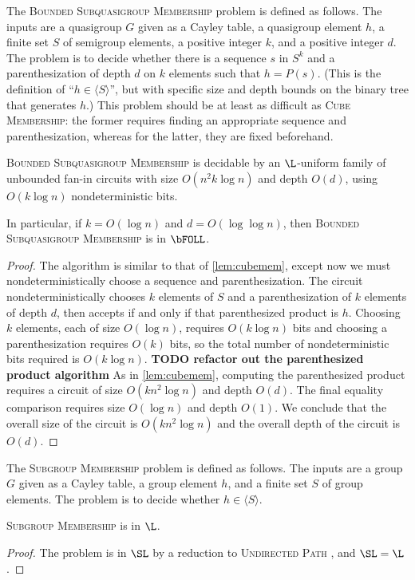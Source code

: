 \documentclass{article}
\newcommand{\todo}[1]{\textbf{TODO #1}}
\newcommand{\gen}[1]{\langle #1 \rangle}
\begin{document}
The \textsc{Bounded Subquasigroup Membership} problem is defined as follows.
The inputs are a quasigroup $G$ given as a Cayley table, a quasigroup element $h$, a finite set $S$ of semigroup elements, a positive integer $k$, and a positive integer $d$.
The problem is to decide whether there is a sequence $s$ in $S^k$ and a parenthesization of depth $d$ on $k$ elements such that $h = P(s)$.
(This is the definition of ``$h \in \gen{S}$'', but with specific size and depth bounds on the binary tree that generates $h$.)
This problem should be at least as difficult as \textsc{Cube Membership}: the former requires finding an appropriate sequence and parenthesization, whereas for the latter, they are fixed beforehand.

\begin{lemma}\label{lem:subquasigroupmem}
  \textsc{Bounded Subquasigroup Membership} is decidable by an $\L$-uniform family of unbounded fan-in circuits with size $O(n^2 k \log n)$ and depth $O(d)$, using $O(k \log n)$ nondeterministic bits.

  In particular, if $k = O(\log n)$ and $d = O(\log \log n)$, then \textsc{Bounded Subquasigroup Membership} is in $\bFOLL$.
\end{lemma}
\begin{proof}
  The algorithm is similar to that of \autoref{lem:cubemem}, except now we must nondeterministically choose a sequence and parenthesization.
  The circuit nondeterministically chooses $k$ elements of $S$ and a parenthesization of $k$ elements of depth $d$, then accepts if and only if that parenthesized product is $h$.
  Choosing $k$ elements, each of size $O(\log n)$, requires $O(k \log n)$ bits and choosing a parenthesization requires $O(k)$ bits, so the total number of nondeterministic bits required is $O(k \log n)$.
  \todo{refactor out the parenthesized product algorithm}
  As in \autoref{lem:cubemem}, computing the parenthesized product requires a circuit of size $O(k n^2 \log n)$ and depth $O(d)$.
  The final equality comparison requires size $O(\log n)$ and depth $O(1)$.
  We conclude that the overall size of the circuit is $O(k n^2 \log n)$ and the overall depth of the circuit is $O(d)$.
\end{proof}

The \textsc{Subgroup Membership} problem is defined as follows.
The inputs are a group $G$ given as a Cayley table, a group element $h$, and a finite set $S$ of group elements.
The problem is to decide whether $h \in \gen{S}$.

\begin{lemma}\label{lem:subgroupmem}
  \textsc{Subgroup Membership} is in $\L$.
\end{lemma}
\begin{proof}
  The problem is in $\SL$ by a reduction to \textsc{Undirected Path} \autocite[Section~3]{bm89}, and $\SL = \L$ \cite{reingold08}.
\end{proof}
\end{document}
